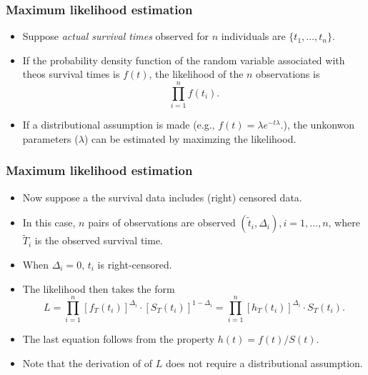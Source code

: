 \documentclass[10pt]{beamer}\usepackage[]{graphicx}\usepackage[]{color}
\newcommand{\empr}[1]{{\emph{\color{red}#1}}}
\begin{document}
\begin{frame}
  \frametitle{Maximum likelihood estimation}
  \begin{itemize}
  \item 
    Suppose \empr{actual survival times} observed for $n$ individuals are $\{t_1, \ldots, t_n\}$.
  \item 
    If the probability density function of the random variable associated with theos survival times is $f(t)$, 
    the likelihood of the $n$ observations is
    \begin{equation*}
      \prod_{i = 1}^nf(t_i).
    \end{equation*}
  \item If a distributional assumption is made (e.g., $f(t) = \lambda e^{-t\lambda}$.), 
    the unkonwon parameters ($\lambda$) can be estimated by maximzing the likelihood.
  \end{itemize}
\end{frame}

\begin{frame}
  \frametitle{Maximum likelihood estimation}
  \begin{itemize}
  \item 
    Now suppose a the survival data includes (right) censored data.
  \item 
    In this case, $n$ pairs of observations are observed $(\tilde{t}_i, \Delta_i), i = 1, \ldots, n$,
    where $\tilde{T}_i$ is the observed survival time. 
  \item When $\Delta_i = 0$, $t_i$ is right-censored.
  \item The likelihood then takes the form
    \begin{equation}
      \label{eq:lik}
      L = \prod_{i = 1}^n\left[f_T(t_i)\right]^{\Delta_i}\cdot \left[S_T(t_i)\right]^{1 - \Delta_i}
      = \prod_{i = 1}^n\left[h_T(t_i)\right]^{\Delta_i}\cdot S_T(t_i).
    \end{equation}
  \item The last equation follows from the property $h(t) = f(t) / S(t)$.
  \item Note that the derivation of of $L$ does not require a distributional assumption.
  \end{itemize}
\end{frame}
\end{document}
